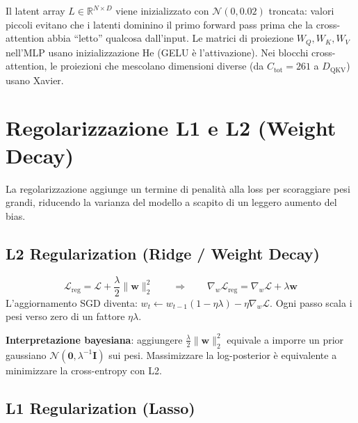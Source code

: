 \documentclass[
  11pt,
]{article}
\begin{document}
\begin{notabox}[title={\textbf{Collegamento al Perceiver}}]
Il latent array $L \in \mathbb{R}^{N \times D}$ viene inizializzato con $\mathcal{N}(0, 0.02)$ troncata: valori piccoli evitano che i latenti dominino il primo forward pass prima che la cross-attention abbia ``letto'' qualcosa dall'input. Le matrici di proiezione $W_Q, W_K, W_V$ nell'MLP usano inizializzazione He (GELU è l'attivazione). Nei blocchi cross-attention, le proiezioni che mescolano dimensioni diverse (da $C_{\text{tot}}=261$ a $D_{\text{QKV}}$) usano Xavier.
\end{notabox}

\section{Regolarizzazione L1 e L2 (Weight Decay)}
\label{app:regularization}

La regolarizzazione aggiunge un termine di penalità alla loss per scoraggiare pesi grandi, riducendo la varianza del modello a scapito di un leggero aumento del bias.

\subsection{L2 Regularization (Ridge / Weight Decay)}

\begin{formulabox}[title={\textbf{L2 Regularization}}]
\[
\mathcal{L}_{\text{reg}} = \mathcal{L} + \frac{\lambda}{2}\|\mathbf{w}\|_2^2
\qquad \Rightarrow \qquad
\nabla_w \mathcal{L}_{\text{reg}} = \nabla_w \mathcal{L} + \lambda \mathbf{w}
\]
L'aggiornamento SGD diventa: $w_t \leftarrow w_{t-1}(1 - \eta\lambda) - \eta \nabla_w \mathcal{L}$. Ogni passo scala i pesi verso zero di un fattore $\eta\lambda$.
\end{formulabox}

\textbf{Interpretazione bayesiana}: aggiungere $\tfrac{\lambda}{2}\|\mathbf{w}\|_2^2$ equivale a imporre un prior gaussiano $\mathcal{N}(\mathbf{0}, \lambda^{-1}\mathbf{I})$ sui pesi. Massimizzare la log-posterior è equivalente a minimizzare la cross-entropy con L2.

\subsection{L1 Regularization (Lasso)}
\end{document}
